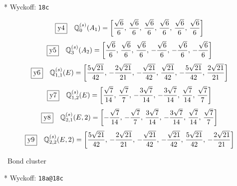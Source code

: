 \documentclass[fleqn,10pt,landscape]{jsarticle}
\begin{document}
\noindent ** Wyckoff: \texttt{18c}

\begin{dmath*}
\fbox{y4}\quad \mathbb{Q}_{0}^{(s)}(A_{1})=\left[ \frac{\sqrt{6}}{6},\, \frac{\sqrt{6}}{6},\, \frac{\sqrt{6}}{6},\, \frac{\sqrt{6}}{6},\, \frac{\sqrt{6}}{6},\, \frac{\sqrt{6}}{6} \right]
\end{dmath*}
\begin{dmath*}
\fbox{y5}\quad \mathbb{Q}_{3}^{(s)}(A_{2})=\left[ \frac{\sqrt{6}}{6},\, \frac{\sqrt{6}}{6},\, \frac{\sqrt{6}}{6},\, - \frac{\sqrt{6}}{6},\, - \frac{\sqrt{6}}{6},\, - \frac{\sqrt{6}}{6} \right]
\end{dmath*}
\begin{dmath*}
\fbox{y6}\quad \mathbb{Q}_{1,1}^{(s)}(E)=\left[ \frac{5 \sqrt{21}}{42},\, - \frac{2 \sqrt{21}}{21},\, - \frac{\sqrt{21}}{42},\, \frac{\sqrt{21}}{42},\, - \frac{5 \sqrt{21}}{42},\, \frac{2 \sqrt{21}}{21} \right]
\end{dmath*}
\begin{dmath*}
\fbox{y7}\quad \mathbb{Q}_{1,2}^{(s)}(E)=\left[ \frac{\sqrt{7}}{14},\, \frac{\sqrt{7}}{7},\, - \frac{3 \sqrt{7}}{14},\, - \frac{3 \sqrt{7}}{14},\, \frac{\sqrt{7}}{14},\, \frac{\sqrt{7}}{7} \right]
\end{dmath*}
\begin{dmath*}
\fbox{y8}\quad \mathbb{Q}_{2,1}^{(s)}(E,2)=\left[ - \frac{\sqrt{7}}{14},\, - \frac{\sqrt{7}}{7},\, \frac{3 \sqrt{7}}{14},\, - \frac{3 \sqrt{7}}{14},\, \frac{\sqrt{7}}{14},\, \frac{\sqrt{7}}{7} \right]
\end{dmath*}
\begin{dmath*}
\fbox{y9}\quad \mathbb{Q}_{2,2}^{(s)}(E,2)=\left[ \frac{5 \sqrt{21}}{42},\, - \frac{2 \sqrt{21}}{21},\, - \frac{\sqrt{21}}{42},\, - \frac{\sqrt{21}}{42},\, \frac{5 \sqrt{21}}{42},\, - \frac{2 \sqrt{21}}{21} \right]
\end{dmath*}
\vspace{5mm}

\noindent\textbullet\, Bond cluster

\vspace{5mm}

\noindent ** Wyckoff: \texttt{18a@18c}
\end{document}

